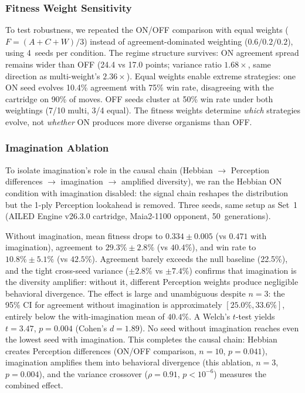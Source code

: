 \documentclass[11pt,a4paper]{article}
\begin{document}
\subsubsection{Fitness Weight Sensitivity}

To test robustness, we repeated the ON/OFF comparison with equal weights ($F = (A + C + W) / 3$) instead of agreement-dominated weighting ($0.6/0.2/0.2$), using 4~seeds per condition.
The regime structure survives: ON agreement spread remains wider than OFF (24.4 vs 17.0 points; variance ratio $1.68\times$, same direction as multi-weight's $2.36\times$).
Equal weights enable extreme strategies: one ON seed evolves 10.4\% agreement with 75\% win rate, disagreeing with the cartridge on 90\% of moves.
OFF seeds cluster at 50\% win rate under both weightings (7/10 multi, 3/4 equal).
The fitness weights determine \emph{which} strategies evolve, not \emph{whether} ON produces more diverse organisms than OFF.

\subsubsection{Imagination Ablation}

To isolate imagination's role in the causal chain (Hebbian $\to$ Perception differences $\to$ imagination $\to$ amplified diversity), we ran the Hebbian ON condition with imagination disabled: the signal chain reshapes the distribution but the 1-ply Perception lookahead is removed.
Three seeds, same setup as Set~1 (AILED Engine v26.3.0 cartridge, Maia2-1100 opponent, 50~generations).

Without imagination, mean fitness drops to $0.334 \pm 0.005$ (vs $0.471$ with imagination), agreement to $29.3\% \pm 2.8\%$ (vs $40.4\%$), and win rate to $10.8\% \pm 5.1\%$ (vs $42.5\%$).
Agreement barely exceeds the null baseline (22.5\%), and the tight cross-seed variance ($\pm 2.8\%$ vs $\pm 7.4\%$) confirms that imagination is the diversity amplifier: without it, different Perception weights produce negligible behavioral divergence.
The effect is large and unambiguous despite $n = 3$: the 95\% CI for agreement without imagination is approximately $[25.0\%, 33.6\%]$, entirely below the with-imagination mean of $40.4\%$.
A Welch's $t$-test yields $t = 3.47$, $p = 0.004$ (Cohen's $d = 1.89$).
No seed without imagination reaches even the lowest seed with imagination.
This completes the causal chain: Hebbian creates Perception differences (ON/OFF comparison, $n = 10$, $p = 0.041$), imagination amplifies them into behavioral divergence (this ablation, $n = 3$, $p = 0.004$), and the variance crossover ($\rho = 0.91$, $p < 10^{-6}$) measures the combined effect.
\end{document}
